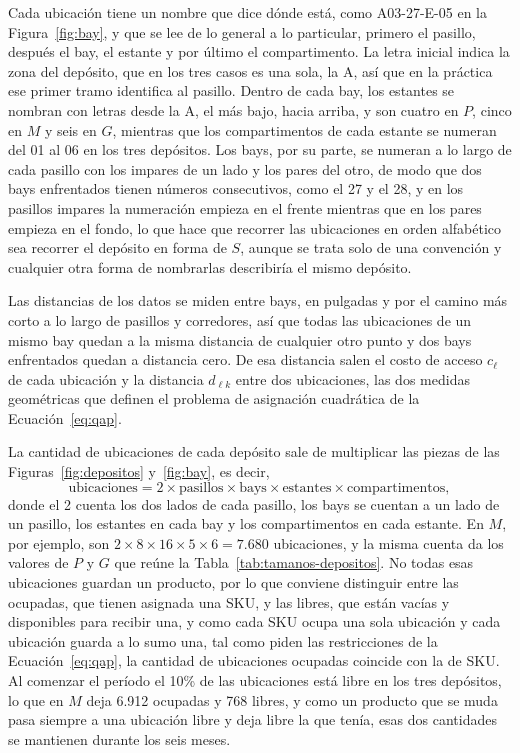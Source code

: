 Cada ubicación tiene un nombre que dice dónde está, como A03-27-E-05 en la Figura~\ref{fig:bay}, y que se lee de lo general a lo particular, primero el pasillo, después el bay, el estante y por último el compartimento.
La letra inicial indica la zona del depósito, que en los tres casos es una sola, la A, así que en la práctica ese primer tramo identifica al pasillo.
Dentro de cada bay, los estantes se nombran con letras desde la A, el más bajo, hacia arriba, y son cuatro en $P$, cinco en $M$ y seis en $G$, mientras que los compartimentos de cada estante se numeran del 01 al 06 en los tres depósitos.
Los bays, por su parte, se numeran a lo largo de cada pasillo con los impares de un lado y los pares del otro, de modo que dos bays enfrentados tienen números consecutivos, como el 27 y el 28, y en los pasillos impares la numeración empieza en el frente mientras que en los pares empieza en el fondo, lo que hace que recorrer las ubicaciones en orden alfabético sea recorrer el depósito en forma de $S$, aunque se trata solo de una convención y cualquier otra forma de nombrarlas describiría el mismo depósito.

Las distancias de los datos se miden entre bays, en pulgadas y por el camino más corto a lo largo de pasillos y corredores, así que todas las ubicaciones de un mismo bay quedan a la misma distancia de cualquier otro punto y dos bays enfrentados quedan a distancia cero.
De esa distancia salen el costo de acceso $c_\ell$ de cada ubicación y la distancia $d_{\ell k}$ entre dos ubicaciones, las dos medidas geométricas que definen el problema de asignación cuadrática de la Ecuación~\ref{eq:qap}.

La cantidad de ubicaciones de cada depósito sale de multiplicar las piezas de las Figuras~\ref{fig:depositos} y~\ref{fig:bay}, es decir,
\begin{equation}
    \text{ubicaciones} = 2 \times \text{pasillos} \times \text{bays} \times \text{estantes} \times \text{compartimentos},
    \label{eq:ubicaciones}
\end{equation}
donde el 2 cuenta los dos lados de cada pasillo, los bays se cuentan a un lado de un pasillo, los estantes en cada bay y los compartimentos en cada estante.
En $M$, por ejemplo, son $2 \times 8 \times 16 \times 5 \times 6 = 7.680$ ubicaciones, y la misma cuenta da los valores de $P$ y $G$ que reúne la Tabla~\ref{tab:tamanos-depositos}.
No todas esas ubicaciones guardan un producto, por lo que conviene distinguir entre las ocupadas, que tienen asignada una SKU, y las libres, que están vacías y disponibles para recibir una, y como cada SKU ocupa una sola ubicación y cada ubicación guarda a lo sumo una, tal como piden las restricciones de la Ecuación~\ref{eq:qap}, la cantidad de ubicaciones ocupadas coincide con la de SKU.
Al comenzar el período el 10\% de las ubicaciones está libre en los tres depósitos, lo que en $M$ deja 6.912 ocupadas y 768 libres, y como un producto que se muda pasa siempre a una ubicación libre y deja libre la que tenía, esas dos cantidades se mantienen durante los seis meses.

